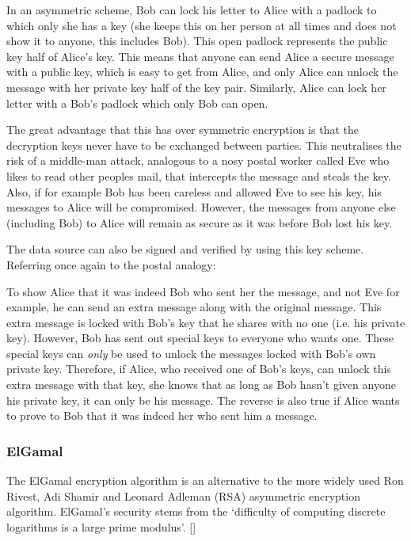In an asymmetric scheme, Bob can lock his letter to Alice with a padlock to which only she has
a key (she keeps this on her person at all times and does not show it to anyone, this
includes Bob). This open padlock represents the public key half of Alice's key. This
means that anyone can send Alice a secure message with a public key, which is easy to
get from Alice, and only Alice can unlock the message with her private key half of the
key pair. Similarly, Alice can lock her letter with a Bob's padlock which only Bob can open.

The great advantage that this has over symmetric encryption is that the decryption keys never
have to be exchanged between parties. This neutralises the risk of a middle-man attack,
analogous to a nosy postal worker called Eve who likes to read other peoples mail, that
intercepts the message and steals the key.
Also, if for example Bob has been careless and allowed Eve to see his key, his messages to
Alice will be compromised. However, the messages from anyone else (including Bob) to Alice will
remain as secure as it was before Bob lost his key.

The data source can also be signed and verified by using this key scheme. Referring once again
to the postal analogy:

To show Alice that it was indeed Bob who sent her the message, and not Eve for example, he can
send an extra message along with the original message. This extra message is locked with Bob's
key that he shares with no one (i.e. his private key). However, Bob has sent out special keys
to everyone who wants one. These special keys can \emph{only} be used to unlock the messages locked with Bob's
own private key. Therefore, if Alice, who received one of Bob's keys, can unlock this extra
message with that key, she knows that as long as Bob hasn't given anyone his private key, it
can only be his message. The reverse is also true if Alice wants to prove to Bob that it was
indeed her who sent him a message. 

\subsubsection{ElGamal}
\label{sec:elgamal}

The ElGamal encryption algorithm is an alternative to the more widely used  Ron Rivest, Adi
Shamir and Leonard Adleman (RSA) asymmetric encryption algorithm. ElGamal's security stems
from the `difficulty of computing discrete logarithms is a large prime modulus'.
[\cite{website:elgamal}]


